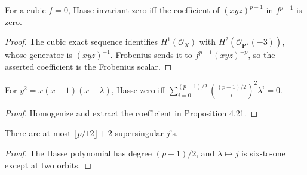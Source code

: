 \begin{proposition}\label{ha-ch4-p421}
For a cubic \(f=0\), Hasse invariant zero iff the coefficient of
\((xyz)^{p-1}\) in \(f^{p-1}\) is zero.
\end{proposition}
\begin{proof}The cubic exact sequence identifies \(H^1(\mathcal O_X)\) with
\(H^2(\mathcal O_{\mathbf P^2}(-3))\), whose generator is \((xyz)^{-1}\).
Frobenius sends it to \(f^{p-1}(xyz)^{-p}\), so the asserted coefficient is
the Frobenius scalar.\end{proof}
\begin{corollary}\label{ha-ch4-c422}
For \(y^2=x(x-1)(x-\lambda)\), Hasse zero iff
\(\sum_{i=0}^{(p-1)/2}{(p-1)/2\choose i}^2\lambda^i=0\).
\end{corollary}
\begin{proof}Homogenize and extract the coefficient in Proposition 4.21.\end{proof}
\begin{corollary}\label{ha-ch4-c423}
There are at most \(\lfloor p/12\rfloor+2\) supersingular \(j\)'s.
\end{corollary}
\begin{proof}The Hasse polynomial has degree \((p-1)/2\), and \(\lambda\mapsto j\)
is six-to-one except at two orbits.\end{proof}

